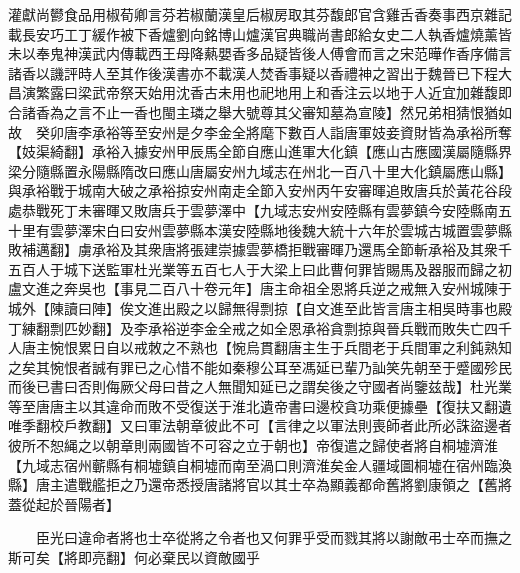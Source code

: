 灌獻尚鬰食品用椒荀卿言芬若椒蘭漢皇后椒房取其芬馥郎官含雞舌香奏事西京雜記載長安巧工丁緩作被下香爐劉向銘博山爐漢官典職尚書郎給女史二人執香爐燒薰皆未以奉鬼神漢武内傳載西王母降爇嬰香多品疑皆後人傅會而言之宋范曄作香序備言諸香以譏評時人至其作後漢書亦不載漢人焚香事疑以香禮神之習出于魏晉已下程大昌演繁露曰梁武帝祭天始用沈香古未用也祀地用上和香注云以地于人近宜加雜馥即合諸香為之言不止一香也閩主璘之舉大號尊其父審知墓為宣陵】然兄弟相猜恨猶如故　癸卯唐李承裕等至安州是夕李金全將麾下數百人詣唐軍妓妾資財皆為承裕所奪【妓渠綺翻】承裕入據安州甲辰馬全節自應山進軍大化鎮【應山古應國漢屬隨縣界梁分隨縣置永陽縣隋改曰應山唐屬安州九域志在州北一百八十里大化鎮屬應山縣】與承裕戰于城南大破之承裕掠安州南走全節入安州丙午安審暉追敗唐兵於黃花谷段處恭戰死丁未審暉又敗唐兵于雲夢澤中【九域志安州安陸縣有雲夢鎮今安陸縣南五十里有雲夢澤宋白曰安州雲夢縣本漢安陸縣地後魏大統十六年於雲城古城置雲夢縣敗補邁翻】虜承裕及其衆唐將張建崇據雲夢橋拒戰審暉乃還馬全節斬承裕及其衆千五百人于城下送監軍杜光業等五百七人于大梁上曰此曹何罪皆賜馬及器服而歸之初盧文進之奔吳也【事見二百八十卷元年】唐主命祖全恩將兵逆之戒無入安州城陳于城外【陳讀曰陣】俟文進出殿之以歸無得剽掠【自文進至此皆言唐主相吳時事也殿丁練翻剽匹妙翻】及李承裕逆李金全戒之如全恩承裕貪剽掠與晉兵戰而敗失亡四千人唐主惋恨累日自以戒敇之不熟也【惋烏貫翻唐主生于兵間老于兵間軍之利鈍熟知之矣其惋恨者誠有罪已之心惜不能如秦穆公耳至馮延已輩乃訕笑先朝至于蹙國殄民而後已書曰否則侮厥父母曰昔之人無聞知延已之謂矣後之守國者尚鑒兹哉】杜光業等至唐唐主以其違命而敗不受復送于淮北遺帝書曰邊校貪功乘便據壘【復扶又翻遺唯季翻校戶教翻】又曰軍法朝章彼此不可【言律之以軍法則喪師者此所必誅盜邊者彼所不恕䋲之以朝章則兩國皆不可容之立于朝也】帝復遣之歸使者將自桐墟濟淮【九域志宿州蘄縣有桐墟鎮自桐墟而南至渦口則濟淮矣金人疆域圖桐墟在宿州臨渙縣】唐主遣戰艦拒之乃還帝悉授唐諸將官以其士卒為顯義都命舊將劉康領之【舊將蓋從起於晉陽者】

　　臣光曰違命者將也士卒從將之令者也又何罪乎受而戮其將以謝敵弔士卒而撫之斯可矣【將即亮翻】何必棄民以資敵國乎


